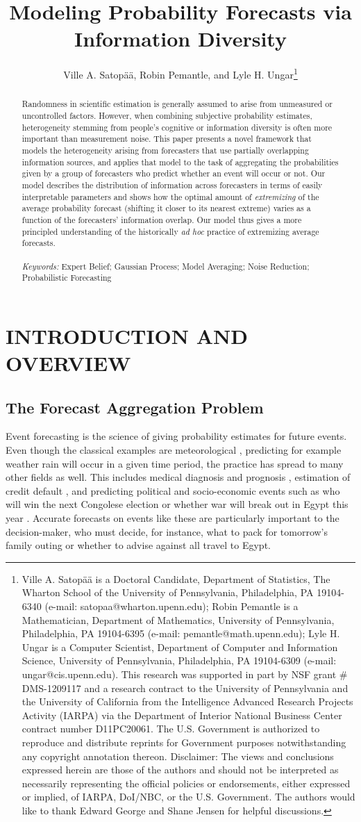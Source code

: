 \documentclass[12pt]{article}
\title{\vspace{-4em}Modeling Probability Forecasts via Information Diversity}
\author{\vspace{-1em}Ville A. Satop\"a\"a, Robin Pemantle, and Lyle H. Ungar\thanks{Ville A. Satop\"a\"a is a Doctoral Candidate, Department of Statistics, The Wharton School of the University of Pennsylvania, Philadelphia, PA 19104-6340 (e-mail: satopaa@wharton.upenn.edu); Robin Pemantle is a Mathematician, Department of Mathematics, University of Pennsylvania, Philadelphia, PA 19104-6395 (e-mail: pemantle@math.upenn.edu); Lyle H. Ungar is a Computer Scientist, Department of Computer and Information Science, University of Pennsylvania, Philadelphia, PA 19104-6309 (e-mail: ungar@cis.upenn.edu). This research was supported in part by NSF grant \# DMS-1209117 and a research contract to the University
of Pennsylvania and the University of California from the Intelligence
Advanced Research Projects Activity (IARPA) via the Department of
Interior National Business Center contract number D11PC20061. The
U.S. Government is authorized to reproduce and distribute reprints for
Government purposes notwithstanding any copyright annotation
thereon. Disclaimer: The views and conclusions expressed herein are
those of the authors and should not be interpreted as necessarily
representing the official policies or endorsements, either expressed
or implied, of IARPA, DoI/NBC, or the U.S. Government.
The authors would like to thank Edward George and Shane Jensen for helpful discussions.}}
\date{\vspace{-8.5ex}}
\theoremstyle{definition}
\theoremstyle{definition}
\begin{document}
\maketitle
\begin{abstract}
Randomness in scientific estimation is generally 
assumed to arise from unmeasured or uncontrolled factors. However, 
when combining subjective probability estimates, heterogeneity
stemming from people's cognitive or information diversity is often
more important than measurement noise.  This paper presents a novel
framework that models the heterogeneity arising from forecasters that use 
partially overlapping information sources, and applies that model to 
the task of aggregating the probabilities given by a group of forecasters 
who predict whether an event will occur or not. Our model describes 
the distribution of information across forecasters in terms of easily
interpretable parameters and shows how the optimal amount
of \textit{extremizing} of the average probability forecast (shifting
it closer to its nearest extreme) varies as a function of the forecasters'
information overlap.  Our model thus gives a more principled
understanding of the historically {\it ad hoc} practice of extremizing
average forecasts.\\
\\
\textit{Keywords:} Expert Belief; Gaussian Process; Model
Averaging; Noise Reduction; Probabilistic Forecasting
\end{abstract}




\newpage
\section{INTRODUCTION AND OVERVIEW}

\subsection{The Forecast Aggregation Problem}
Event forecasting is the science of giving probability estimates for future events.  Even though the classical examples are meteorological
\citep{sanders1963subjective}, predicting for example weather rain will occur in a given time period, the practice has 
spread to many other fields as well. This includes medical diagnosis
and prognosis \citep{wilson1998prediction,pepe2003statistical,
o2006uncertain}, estimation of credit default
\citep{kramer2006evaluating}, and predicting political and
socio-economic events such as who will win
the next Congolese election or whether war will break out in Egypt
this year \citep{tetlock2005expert}. Accurate forecasts on events like these are particularly important to the decision-maker, who must decide, for instance, what to pack
for tomorrow's family outing or whether to advise against all travel
to Egypt.
\end{document}
